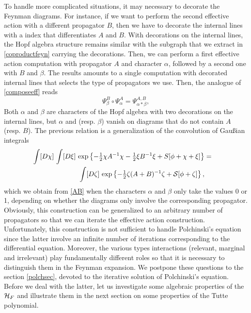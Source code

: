 \documentclass[12pt,here,feynmf]{article}
\begin{document}
To handle more complicated situations, it may necessary to decorate the Feynman diagrams. For instance, if we want to perform the second effective action with a different propagator $B$, then we have to decorate the internal lines with a index that differentiates $A$ and $B$. With decorations on the internal lines, the Hopf algebra structure remains similar with the subgraph that we extract in \eqref{coproductfeyn} carrying the decorations. Then, we can perform a first effective action computation with propagator $A$ and character $\alpha$, followed by a second one with $B$ and $\beta$. The results amounts to a single computation with decorated internal lines that selects the type of propagators we use. Then, the analogue of \eqref{composeeff} reads
\begin{equation}
\Psi_{\beta}^{B}\circ\Psi_{\alpha}^{A}=\Psi_{\alpha\ast\beta}^{A,B}\label{AB},
\end{equation}
Both $\alpha$ and $\beta$ are characters of the Hopf algebra with two decorations on the internal lines, but $\alpha$ and (resp. $\beta$) vanish on diagrams that do not contain $A$ (resp. $B$). The previous relation is a generalization of the convolution of Gau\ss ian integrals
\begin{eqnarray}
\int[D\chi]\,\int[D\xi]\,
\exp\left\{-{\textstyle\frac{1}{2}}\chi A^{-1}\chi-{\textstyle \frac{1}{2}}\xi B^{-1}\xi+\-S[\phi+\chi+\xi]\right\}&=&\cr
\int[D\zeta]\,\exp\left\{-{\textstyle\frac{1}{2}}\zeta(A+B)^{-1}\zeta+{\cal
S}[\phi+\zeta]\right\},&&
\end{eqnarray}
which we obtain from \eqref{AB} when the characters $\alpha$ and $\beta$ only take the values 0 or 1, depending on whether the diagrams only involve the corresponding propagator. Obviously, this construction can be generalized to an arbitrary number of propagators so that we can iterate the effective action construction. Unfortunately, this construction is not sufficient to handle Polchinski's equation since the latter involve an infinite number of iterations corresponding to the differential equation. Moreover, the various types interactions (relevant, marginal and irrelevant) play fundamentally different roles so that it is necessary to distinguish them in the Feynman expansion. We postpone these questions to the section \ref{polchsec}, devoted to the iterative solution of Polchinski's equation.  Before we deal with the latter, let us  investigate some algebraic properties of the ${\cal H}_{F}$ and illustrate them in the next section on some properties of the Tutte polynomial.
 
\end{document}
